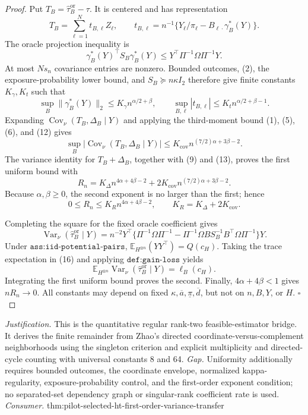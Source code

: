 \documentclass{article}
\begin{document}
\begin{proof}
Put \(T_B=\widehat\tau_B^{\mathrm{or}}-\tau\).  It is centered and has representation
\[
T_B=\sum_{\ell=1}^Nt_{B,\ell}Z_\ell,
\qquad
t_{B,\ell}=n^{-1}\{Y_\ell/\pi_\ell-B_{\ell\cdot}\gamma_B^*(Y)\}.
\tag{10}
\]
The oracle projection inequality is
\[
\gamma_B^*(Y)^{\top}S_B\gamma_B^*(Y)
\le Y^{\top}\Pi^{-1}\Omega\Pi^{-1}Y.
\tag{11}
\]
At most \(Ns_n\) covariance entries are nonzero.  Bounded outcomes, (2), the exposure-probability lower bound, and \(S_B\succeq n\kappa I_2\) therefore give finite constants \(K_\gamma,K_t\) such that
\[
\sup_B\lVert\gamma_B^*(Y)\rVert_2\le K_\gamma n^{\alpha/2+\beta},
\qquad
\sup_{B,\ell}|t_{B,\ell}|\le K_tn^{\alpha/2+\beta-1}.
\tag{12}
\]
Expanding \(\operatorname{Cov}_\nu(T_B,\Delta_B\mid Y)\) and applying the third-moment bound (1), (5), (6), and (12) gives
\[
\sup_B|\operatorname{Cov}_\nu(T_B,\Delta_B\mid Y)|
\le K_{\mathrm{cov}}n^{(7/2)\alpha+3\beta-2}.
\tag{13}
\]
The variance identity for \(T_B+\Delta_B\), together with (9) and (13), proves the first uniform bound with
\[
R_n=K_\Delta n^{4\alpha+4\beta-2}
+2K_{\mathrm{cov}}n^{(7/2)\alpha+3\beta-2}.
\tag{14}
\]
Because \(\alpha,\beta\ge0\), the second exponent is no larger than the first; hence
\[
0\le R_n\le K_Rn^{4\alpha+4\beta-2},
\qquad K_R=K_\Delta+2K_{\mathrm{cov}}.
\tag{15}
\]

Completing the square for the fixed oracle coefficient gives
\[
\operatorname{Var}_\nu(\widehat\tau_B^{\mathrm{or}}\mid Y)
=n^{-2}Y^{\top}\{\Pi^{-1}\Omega\Pi^{-1}
-\Pi^{-1}\Omega BS_B^{-1}B^{\top}\Omega\Pi^{-1}\}Y.
\tag{16}
\]
Under \(\texttt{ass:iid-potential-pairs}\), \(\mathbb E_{H^{\otimes n}}(YY^{\top})=Q(c_H)\).  Taking the trace expectation in (16) and applying \(\texttt{def:gain-loss}\) yields
\[
\mathbb E_{H^{\otimes n}}\operatorname{Var}_\nu(\widehat\tau_B^{\mathrm{or}}\mid Y)
=\ell_B(c_H).
\tag{17}
\]
Integrating the first uniform bound proves the second.  Finally, \(4\alpha+4\beta<1\) gives \(nR_n\to0\).  All constants may depend on fixed \(\kappa,\overline a,\underline\pi,\overline d\), but not on \(n,B,Y\), or \(H\). \(\square\)
\end{proof}
\par\smallskip\noindent \textit{Justification.} This is the quantitative regular rank-two feasible-estimator bridge.  It derives the finite remainder from Zhao's directed coordinate-versus-complement neighborhoods using the singleton criterion and explicit multiplicity and directed-cycle counting with universal constants 8 and 64. \textit{Gap.} Uniformity additionally requires bounded outcomes, the coordinate envelope, normalized kappa-regularity, exposure-probability control, and the first-order exponent condition; no separated-set dependency graph or singular-rank coefficient rate is used. \textit{Consumer.} thm:pilot-selected-ht-first-order-variance-transfer
\end{document}
